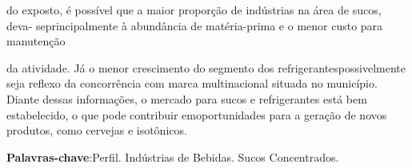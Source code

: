 \documentclass[article,12pt,onesidea,4paper,english,brazil]{abntex2}
\begin{document}
	do exposto, é possível que a maior proporção de indústrias na área de sucos, deva-
	seprincipalmente à abundância de matéria-prima e o menor custo para manutenção
	
	da atividade. Já o menor crescimento do segmento dos refrigerantespossivelmente
	seja reflexo da concorrência com marca multinacional situada no município. Diante
	dessas informações, o mercado para sucos e refrigerantes está bem estabelecido, o
	que pode contribuir emoportunidades para a geração de novos produtos, como
	cervejas e isotônicos.
	
	\vspace{\onelineskip}
	
	\noindent
	\textbf{Palavras-chave}:Perfil. Indústrias de Bebidas. Sucos Concentrados.
	
\end{document}
